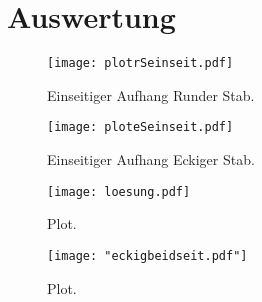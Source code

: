 \section{Auswertung}
\label{sec:Auswertung}

\begin{figure}
  \centering
  \texttt{[image: plotrSeinseit.pdf]}
  \caption{Einseitiger Aufhang Runder Stab.}
  \label{fig:plotrSeinseit}
\end{figure}

\begin{figure}
  \centering
  \texttt{[image: ploteSeinseit.pdf]}
  \caption{Einseitiger Aufhang Eckiger Stab.}
  \label{fig:ploteSeinseit}
\end{figure}

\begin{figure}
  \centering
  \texttt{[image: loesung.pdf]}
  \caption{Plot.}
  \label{fig:plotbeidseitig}
\end{figure}

\begin{figure}
  \centering
  \texttt{[image: "eckigbeidseit.pdf"]}
  \caption{Plot.}
  \label{fig:plotbeidseitig}
\end{figure}



